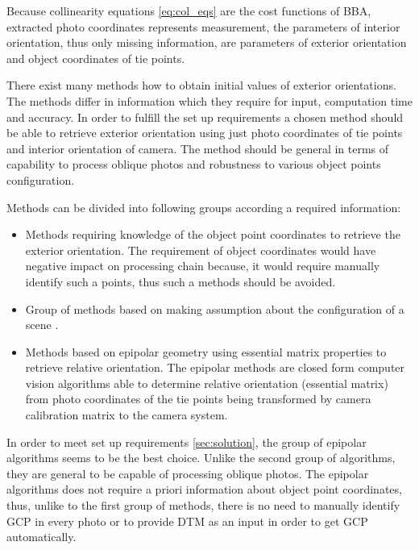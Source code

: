 \documentclass[a4paper,12pt]{article}
\begin{document}
Because collinearity equations \eqref{eq:col_eqs} are the cost functions of BBA,
extracted photo coordinates represents measurement,
the parameters of interior orientation, thus only missing information, 
are parameters of exterior orientation and object coordinates of 
tie points. 


There exist many methods how to obtain initial values of exterior orientations. The methods 
differ in information which they require for input, computation time and accuracy. 
In order to fulfill the set up requirements a chosen method should be able to retrieve exterior orientation 
using just photo coordinates of tie points and interior orientation of camera. The method 
should be general in terms of capability to process oblique photos and robustness to 
various object points configuration.

Methods can be divided into following groups according a required information:
\begin{itemize}
\item Methods requiring knowledge of the object point coordinates to retrieve the exterior
orientation. The requirement of object coordinates would have negative impact on processing 
chain because, it would require manually identify such a points, thus 
such a methods should be avoided. 
\item Group of  methods based on making assumption about the configuration of a scene \label{sec:assum}.  
\item Methods based on epipolar geometry using essential matrix properties to 
retrieve relative orientation.
The epipolar methods are closed form computer vision algorithms
able to determine relative orientation (essential matrix) from photo coordinates 
of the tie points being transformed by camera calibration matrix 
to the camera system. 
\end{itemize}

In order to meet set up requirements \ref{sec:solution}, the group of epipolar 
algorithms seems to be the best choice. Unlike the second group of algorithms,
they are general to be capable of processing oblique photos. The epipolar algorithms
does not require a priori information about object point coordinates, thus, unlike
to the first group of methods,
there is no need to manually identify GCP in every photo or to provide  
DTM as an input in order to get GCP automatically.
\end{document}
